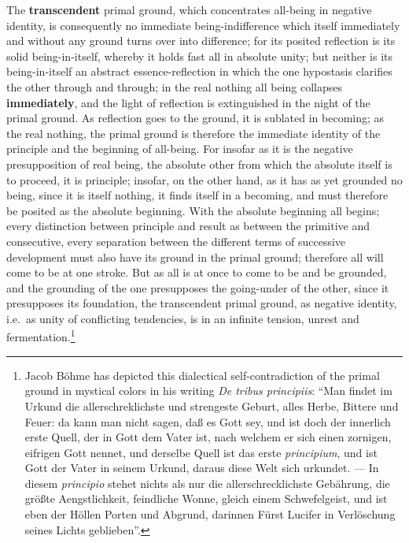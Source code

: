 \documentclass[12pt,a4paper,openany]{book}
\newcommand{\opage}[1]{\marginnote{\footnotesize\textit{[#1]}}}
\begin{document}
The \textbf{transcendent} primal ground, which concentrates all-being
in negative identity, is consequently no immediate
being-indifference which itself immediately and without any
ground turns over into difference; for its posited reflection
is its solid being-in-itself, whereby it holds fast
all in absolute unity; but neither is its being-in-itself
an abstract essence-reflection in which the one hypostasis
clarifies the other through and through; in the real nothing all
being collapses \textbf{immediately}, and the light of reflection
is extinguished in the night of the primal ground. As reflection goes
to the ground, it is sublated in becoming; as the real nothing,
the primal ground is therefore the immediate identity of the principle and the beginning of all-being. For insofar as it
is the negative presupposition of real being, the absolute
other from which the absolute itself is to proceed, it is
principle; insofar, on the other hand, as it has as yet grounded
no being, since it is itself nothing, it finds
itself in a becoming, and must therefore be posited as the
absolute beginning. With the absolute beginning
all begins; every distinction between principle and
\setcounter{footnote}{0}%
\opage{129}result as between the primitive and consecutive, every
separation between the different terms of successive development
must also have its ground in the primal ground;
therefore all will come to be at one stroke. But as all is
at once to come to be and be grounded, and the grounding of the one
presupposes the going-under of the other, since it
presupposes its foundation, the transcendent primal ground,
as negative identity, i.e.\ as unity of conflicting tendencies,
is in an infinite tension, unrest and fermentation.\footnote{Jacob Böhme has depicted this dialectical self-contradiction of the primal ground in mystical colors in his writing \textit{De tribus principiis}: ``Man findet im Urkund die allerschreklichste und strengeste Geburt, alles Herbe, Bittere und Feuer: da kann man nicht sagen, daß es Gott sey, und ist doch der innerlich erste Quell, der in Gott dem Vater ist, nach welchem er sich einen zornigen, eifrigen Gott nennet, und derselbe Quell ist das erste \textit{principium}, und ist Gott der Vater in seinem Urkund, daraus diese Welt sich urkundet. — In diesem \textit{principio} stehet nichts als nur die allerschrecklichste Gebährung, die größte Aengstlichkeit, feindliche Wonne, gleich einem Schwefelgeist, und ist eben der Höllen Porten und Abgrund, darinnen Fürst Lucifer in Verlöschung seines Lichts geblieben''.}
\end{document}

